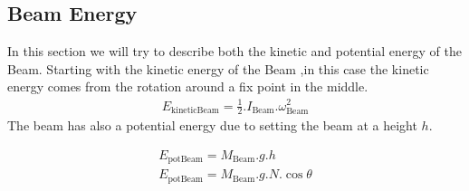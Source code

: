 
\newpage
\subsection{Beam Energy}
\noindent In this section we will try to describe both the kinetic and potential energy of the Beam.
Starting with the kinetic energy of the Beam ,in this case the kinetic energy comes from the rotation around a fix point in the
middle.
\begin{equation}\label{kineticBeam}
	\begin{split}
		E_{\text{kineticBeam}} = \frac{1}{2}.I_{\text{Beam}}.\omega_{\text{Beam}}^2
	\end{split}	
\end{equation}
\noindent The beam has also a potential energy due to setting the beam at a height $h$.

\begin{equation}
	\begin{split}
		E_{\text{potBeam}} = M_{\text{Beam}}.g.h \\
		E_{\text{potBeam}} = M_{\text{Beam}}.g.N.\cos{\theta}
	\end{split}
\end{equation}

